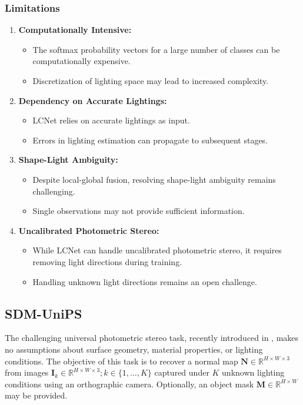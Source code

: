 \subsubsection{Limitations}

\begin{enumerate}
    \item \textbf{Computationally Intensive:}
    \begin{itemize}
        \item The softmax probability vectors for a large number of classes can be computationally expensive.
        \item Discretization of lighting space may lead to increased complexity.
    \end{itemize}
    
    \item \textbf{Dependency on Accurate Lightings:}
    \begin{itemize}
        \item LCNet relies on accurate lightings as input.
        \item Errors in lighting estimation can propagate to subsequent stages.
    \end{itemize}
    
    \item \textbf{Shape-Light Ambiguity:}
    \begin{itemize}
        \item Despite local-global fusion, resolving shape-light ambiguity remains challenging.
        \item Single observations may not provide sufficient information.
    \end{itemize}
    
    \item \textbf{Uncalibrated Photometric Stereo:}
    \begin{itemize}
        \item While LCNet can handle uncalibrated photometric stereo, it requires removing light directions during training.
        \item Handling unknown light directions remains an open challenge.
    \end{itemize}
\end{enumerate}


\subsection{SDM-UniPS} 
The challenging universal photometric stereo task, recently introduced in \cite{unips}, makes no assumptions about surface geometry, material properties, or lighting conditions. The objective of this task is to recover a normal map $\mathbf{N} \in \mathbb{R}^{H \times W \times 3}$ from images $\mathbf{I}_k \in \mathbb{R}^{H \times W \times 3}; k \in \{1, \ldots, K\}$ captured under $K$ unknown lighting conditions using an orthographic camera. Optionally, an object mask $\mathbf{M} \in \mathbb{R}^{H \times W}$ may be provided.

